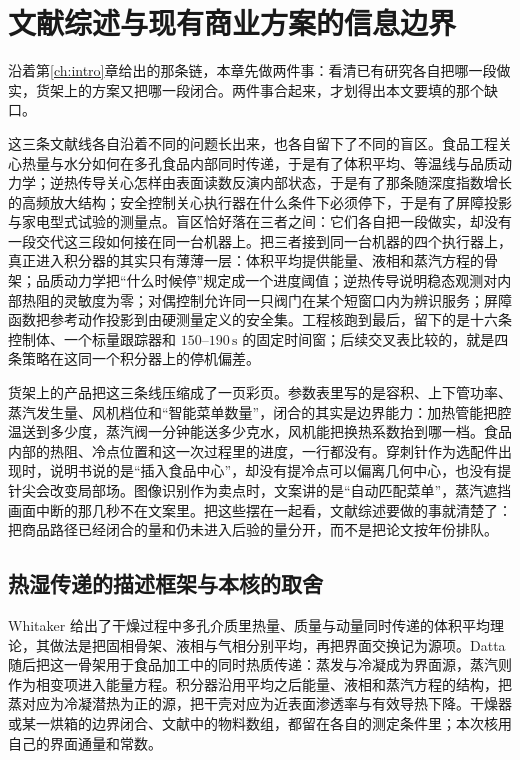 \chapter{文献综述与现有商业方案的信息边界}
\label{ch:lit}

沿着第\ref{ch:intro}{}章给出的那条链，本章先做两件事：看清已有研究各自把哪一段做实，货架上的方案又把哪一段闭合。两件事合起来，才划得出本文要填的那个缺口。

这三条文献线各自沿着不同的问题长出来，也各自留下了不同的盲区。食品工程关心热量与水分如何在多孔食品内部同时传递，于是有了体积平均、等温线与品质动力学；逆热传导关心怎样由表面读数反演内部状态，于是有了那条随深度指数增长的高频放大结构；安全控制关心执行器在什么条件下必须停下，于是有了屏障投影与家电型式试验的测量点。盲区恰好落在三者之间：它们各自把一段做实，却没有一段交代这三段如何接在同一台机器上。把三者接到同一台机器的四个执行器上，真正进入积分器的其实只有薄薄一层：体积平均提供能量、液相和蒸汽方程的骨架；品质动力学把“什么时候停”规定成一个进度阈值；逆热传导说明稳态观测对内部热阻的灵敏度为零；对偶控制允许同一只阀门在某个短窗口内为辨识服务；屏障函数把参考动作投影到由硬测量定义的安全集。工程核跑到最后，留下的是十六条控制体、一个标量跟踪器和 \(150\)--\(190\,\mathrm{s}\) 的固定时间窗；后续交叉表比较的，就是四条策略在这同一个积分器上的停机偏差。

货架上的产品把这三条线压缩成了一页彩页。参数表里写的是容积、上下管功率、蒸汽发生量、风机档位和“智能菜单数量”，闭合的其实是边界能力：加热管能把腔温送到多少度，蒸汽阀一分钟能送多少克水，风机能把换热系数抬到哪一档。食品内部的热阻、冷点位置和这一次过程里的进度，一行都没有。穿刺针作为选配件出现时，说明书说的是“插入食品中心”，却没有提冷点可以偏离几何中心，也没有提针尖会改变局部场。图像识别作为卖点时，文案讲的是“自动匹配菜单”，蒸汽遮挡画面中断的那几秒不在文案里。把这些摆在一起看，文献综述要做的事就清楚了：把商品路径已经闭合的量和仍未进入后验的量分开，而不是把论文按年份排队。

\section{热湿传递的描述框架与本核的取舍}

Whitaker 给出了干燥过程中多孔介质里热量、质量与动量同时传递的体积平均理论\cite{whitaker1977}，其做法是把固相骨架、液相与气相分别平均，再把界面交换记为源项。Datta 随后把这一骨架用于食品加工中的同时热质传递\cite{datta2007}：蒸发与冷凝成为界面源，蒸汽则作为相变项进入能量方程。积分器沿用平均之后能量、液相和蒸汽方程的结构，把蒸对应为冷凝潜热为正的源，把干壳对应为近表面渗透率与有效导热下降。干燥器或某一烘箱的边界闭合、文献中的物料数组，都留在各自的测定条件里；本次核用自己的界面通量和常数。

